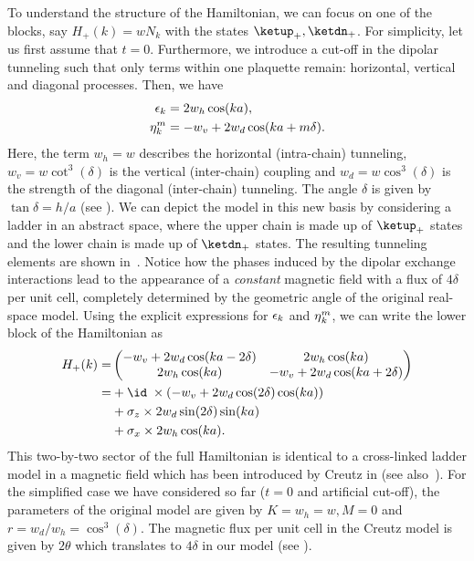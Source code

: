 
To understand the structure of the Hamiltonian, we can focus on one of the blocks, say $H_+(k) = w N_k$ with the states $\ketup_+, \ketdn_+$.
For simplicity, let us first assume that $t=0$.
Furthermore, we introduce a cut-off in the dipolar tunneling such that only terms within one plaquette remain: horizontal, vertical and diagonal processes.
Then, we have
\begin{align}
    \operatorname{\epsilon}_k &= 2 w_h \cos(ka), \\
    \eta_k^m &= -w_v + 2 w_d \cos(ka + m\delta).
\end{align}
Here, the term $w_h = w$ describes the horizontal (intra-chain) tunneling, $w_v = w \cot^3(\delta)$ is the vertical (inter-chain) coupling and $w_d = w \cos^3(\delta)$ is the strength of the diagonal (inter-chain) tunneling.
The angle $\delta$ is given by $\tan \delta = h/a$ (see ).
We can depict the model in this new basis by considering a ladder in an abstract space, where the upper chain is made up of $\ketup_+$ states and the lower chain is made up of $\ketdn_+$ states.
The resulting tunneling elements are shown in~.
Notice how the phases induced by the dipolar exchange interactions lead to the appearance of a \emph{constant} magnetic field with a flux of $4\delta$ per unit cell, completely determined by the geometric angle of the original real-space model.
Using the explicit expressions for $\operatorname{\epsilon}_k$ and $\operatorname{\eta}^m_k$, we can write the lower block of the Hamiltonian as
\begin{align}
    H_+(k) = &\begin{pmatrix}
        -w_v + 2w_d \cos(ka-2\delta) & 2w_h \cos(ka) \\
        2w_h\cos(ka) & -w_v + 2w_d \cos(ka+2\delta)
    \end{pmatrix} \\
    = &+\id \; \times (-w_v + 2w_d \cos(2\delta) \cos(ka)) \\
    &+\sigma_z \times 2w_d \sin(2\delta) \sin(ka) \\
    &+\sigma_x \times 2w_h \cos(ka).
\end{align}
This two-by-two sector of the full Hamiltonian is identical to a cross-linked ladder model in a magnetic field which has been introduced by Creutz in  (see also~\cite{Tovmasyan2013a}).
For the simplified case we have considered so far ($t=0$ and artificial cut-off), the parameters of the original model are given by $K=w_h=w, M=0$ and $r=w_d/w_h=\cos^3(\delta)$.
The magnetic flux per unit cell in the Creutz model is given by $2\theta$ which translates to $4\delta$ in our model (see ).

